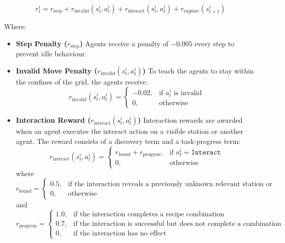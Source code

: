 \begin{equation}
 r_t^i = r_{\text{step}} + r_{\text{invalid}}(s_t^i, a_t^i) + r_{\text{interact}}(s_t^i, a_t^i) + r_{\text{explore}}(s_{t+1}^i)
\end{equation}

Where:

\begin{itemize}
    \item \textbf{Step Penalty ($r_{\text{step}}$)}
    Agents receive a penalty of $-0.005$ every step to prevent idle behaviour.
    \item \textbf{Invalid Move Penalty ($r_{\text{invalid}}(s_t^i, a_t^i)$)}
    To teach the agents to stay within the confines of the grid, the agents receive:
    \begin{equation}
        r_{\text{invalid}}(s_t^i, a_t^i) =
        \begin{cases}
            -0.02, & \text{if $a_t^i$ is invalid} \\
            0, & \text{otherwise}
        \end{cases}
    \end{equation}
    \item \textbf{Interaction Reward ($r_{\text{interact}}(s_t^i, a_t^i)$)}
    Interaction rewards are awarded when an agent executes the interact action on a visible station or another agent. The reward consists of a discovery term and a task-progress term:
    \begin{equation}
        r_{\text{interact}}(s_t^i, a_t^i) =
        \begin{cases}
            r_{\text{found}} + r_{\text{progress}}, & \text{if } a_t^i = \texttt{Interact} \\
            0, & \text{otherwise}
        \end{cases}
    \end{equation}
    where
    \begin{equation}
        r_{\text{found}} =
        \begin{cases}
            0.5, & \text{if the interaction reveals a previously unknown relevant station or agent} \\
            0, & \text{otherwise}
        \end{cases}
    \end{equation}
    and
    \begin{equation}
        r_{\text{progress}} =
        \begin{cases}
            1.0, & \text{if the interaction completes a recipe combination} \\
            0.7, & \text{if the interaction is successful but does not complete a combination} \\
            0, & \text{if the interaction has no effect}
        \end{cases}
    \end{equation}


\end{itemize}

